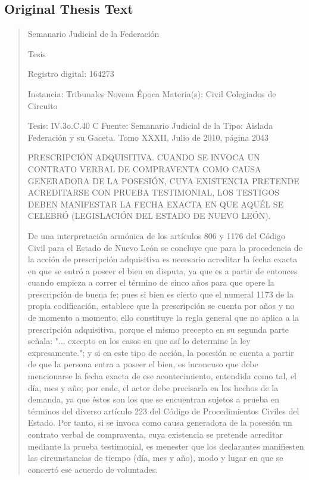 \documentclass[11pt,a4paper]{article}
\begin{document}
\subsection{Original Thesis Text}

\begin{quote}
                                                   Semanario Judicial de la Federación

                                                  Tesis

 Registro digital: 164273

 Instancia: Tribunales            Novena Época                        Materia(s): Civil
 Colegiados de Circuito

 Tesis: IV.3o.C.40 C              Fuente: Semanario Judicial de la    Tipo: Aislada
                                  Federación y su Gaceta.
                                  Tomo XXXII, Julio de 2010, página
                                  2043


PRESCRIPCIÓN ADQUISITIVA. CUANDO SE INVOCA UN CONTRATO VERBAL DE
COMPRAVENTA COMO CAUSA GENERADORA DE LA POSESIÓN, CUYA EXISTENCIA
PRETENDE ACREDITARSE CON PRUEBA TESTIMONIAL, LOS TESTIGOS DEBEN
MANIFESTAR LA FECHA EXACTA EN QUE AQUÉL SE CELEBRÓ (LEGISLACIÓN DEL ESTADO
DE NUEVO LEÓN).


De una interpretación armónica de los artículos 806 y 1176 del Código Civil para el Estado de
Nuevo León se concluye que para la procedencia de la acción de prescripción adquisitiva es
necesario acreditar la fecha exacta en que se entró a poseer el bien en disputa, ya que es a partir
de entonces cuando empieza a correr el término de cinco años para que opere la prescripción de
buena fe; pues si bien es cierto que el numeral 1173 de la propia codificación, establece que la
prescripción se cuenta por años y no de momento a momento, ello constituye la regla general que
no aplica a la prescripción adquisitiva, porque el mismo precepto en su segunda parte señala: "...
excepto en los casos en que así lo determine la ley expresamente."; y si en este tipo de acción, la
posesión se cuenta a partir de que la persona entra a poseer el bien, es inconcuso que debe
mencionarse la fecha exacta de ese acontecimiento, entendida como tal, el día, mes y año; por
ende, el actor debe precisarla en los hechos de la demanda, ya que éstos son los que se
encuentran sujetos a prueba en términos del diverso artículo 223 del Código de Procedimientos
Civiles del Estado. Por tanto, si se invoca como causa generadora de la posesión un contrato verbal
de compraventa, cuya existencia se pretende acreditar mediante la prueba testimonial, es menester
que los declarantes manifiesten las circunstancias de tiempo (día, mes y año), modo y lugar en que
se concertó ese acuerdo de voluntades.


\end{quote}
\end{document}

